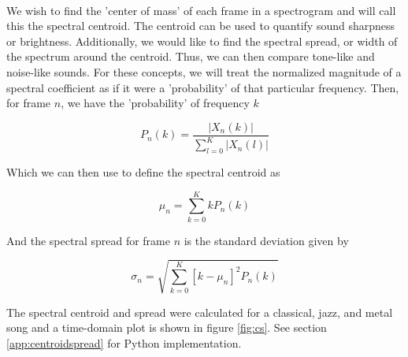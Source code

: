 \documentclass[11pt,a4paper]{article}
\begin{document}
\paragraph*{} We wish to find the 'center of mass' of each frame in a spectrogram and will call this the spectral centroid. The centroid can be used to quantify sound sharpness or brightness. Additionally, we would like to find the spectral spread, or width of the spectrum around the centroid. Thus, we can then compare tone-like and noise-like sounds. For these concepts, we will treat the normalized magnitude of a spectral coefficient as if it were a 'probability' of that particular frequency. Then, for frame $n$, we have the 'probability' of frequency $k$

\begin{equation} \label{eqn:P}
P_n(k) = \frac{|X_n(k)|}{\sum_{l=0}^{K} |X_n(l)|}
\end{equation}

Which we can then use to define the spectral centroid as

\begin{equation}
\mu_n = \sum_{k=0}^{K} kP_n(k)
\end{equation}

And the spectral spread for frame $n$ is the standard deviation given by

\begin{equation}
\sigma_n = \sqrt{\sum_{k=0}^{K} [k-\mu_n]^2 P_n(k)}
\end{equation}

The spectral centroid and spread were calculated for a classical, jazz, and metal song and a time-domain plot is shown in figure \ref{fig:cs}. See section \ref{app:centroidspread} for Python implementation.

\pagebreak
\end{document}
